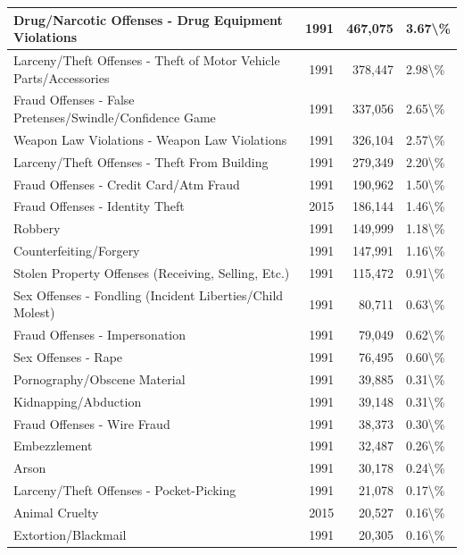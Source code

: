\documentclass[
]{krantz}
\begin{document}
\begin{longtable}[t]{l|r|r|l}
\hline
Drug/Narcotic Offenses - Drug Equipment Violations & 1991 & 467,075 & 3.67\textbackslash{}\%\\
\hline
Larceny/Theft Offenses - Theft of Motor Vehicle Parts/Accessories & 1991 & 378,447 & 2.98\textbackslash{}\%\\
\hline
Fraud Offenses - False Pretenses/Swindle/Confidence Game & 1991 & 337,056 & 2.65\textbackslash{}\%\\
\hline
Weapon Law Violations - Weapon Law Violations & 1991 & 326,104 & 2.57\textbackslash{}\%\\
\hline
Larceny/Theft Offenses - Theft From Building & 1991 & 279,349 & 2.20\textbackslash{}\%\\
\hline
Fraud Offenses - Credit Card/Atm Fraud & 1991 & 190,962 & 1.50\textbackslash{}\%\\
\hline
Fraud Offenses - Identity Theft & 2015 & 186,144 & 1.46\textbackslash{}\%\\
\hline
Robbery & 1991 & 149,999 & 1.18\textbackslash{}\%\\
\hline
Counterfeiting/Forgery & 1991 & 147,991 & 1.16\textbackslash{}\%\\
\hline
Stolen Property Offenses (Receiving, Selling, Etc.) & 1991 & 115,472 & 0.91\textbackslash{}\%\\
\hline
Sex Offenses - Fondling (Incident Liberties/Child Molest) & 1991 & 80,711 & 0.63\textbackslash{}\%\\
\hline
Fraud Offenses - Impersonation & 1991 & 79,049 & 0.62\textbackslash{}\%\\
\hline
Sex Offenses - Rape & 1991 & 76,495 & 0.60\textbackslash{}\%\\
\hline
Pornography/Obscene Material & 1991 & 39,885 & 0.31\textbackslash{}\%\\
\hline
Kidnapping/Abduction & 1991 & 39,148 & 0.31\textbackslash{}\%\\
\hline
Fraud Offenses - Wire Fraud & 1991 & 38,373 & 0.30\textbackslash{}\%\\
\hline
Embezzlement & 1991 & 32,487 & 0.26\textbackslash{}\%\\
\hline
Arson & 1991 & 30,178 & 0.24\textbackslash{}\%\\
\hline
Larceny/Theft Offenses - Pocket-Picking & 1991 & 21,078 & 0.17\textbackslash{}\%\\
\hline
Animal Cruelty & 2015 & 20,527 & 0.16\textbackslash{}\%\\
\hline
Extortion/Blackmail & 1991 & 20,305 & 0.16\textbackslash{}\%\\

\end{longtable}
\end{document}
